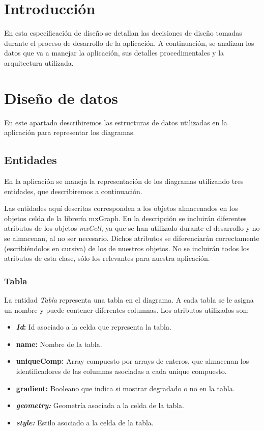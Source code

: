 
\section{Introducción}

En esta especificación de diseño se detallan las decisiones de diseño tomadas durante el proceso de desarrollo de la aplicación. A continuación, se analizan los datos que va a manejar la aplicación, sus detalles procedimentales y la arquitectura utilizada.

\section{Diseño de datos}

En este apartado describiremos las estructuras de datos utilizadas en la aplicación para representar los diagramas.

\subsection{Entidades}

En la aplicación se maneja la representación de los diagramas utilizando tres entidades, que describiremos a continuación.

Las entidades aquí descritas corresponden a los objetos almacenados en los objetos celda de la librería mxGraph. En la descripción se incluirán diferentes atributos de los objetos \emph{mxCell}, ya que se han utilizado durante el desarrollo y no se almacenan, al no ser necesario. Dichos atributos se diferenciarán correctamente (escribiéndolos en cursiva) de los de nuestros objetos. No se incluirán todos los atributos de esta clase, sólo los relevantes para nuestra aplicación.

\subsubsection{Tabla}

La entidad \emph{Tabla} representa una tabla en el diagrama. A cada tabla se le asigna un nombre y puede contener diferentes columnas. Los atributos utilizados son:
\begin{itemize}
    \item \textbf{\textit{Id}: }Id asociado a la celda que representa la tabla.
    \item \textbf{name: }Nombre de la tabla.
    \item \textbf{uniqueComp: }Array compuesto por arrays de enteros, que almacenan los identificadores de las columnas asociadas a cada unique compuesto.
    \item \textbf{gradient: }Booleano que indica si mostrar degradado o no en la tabla.
    \item \textbf{\textit{geometry: }}Geometría asociada a la celda de la tabla.
    \item \textbf{\textit{style: }}Estilo asociado a la celda de la tabla.
\end{itemize}

